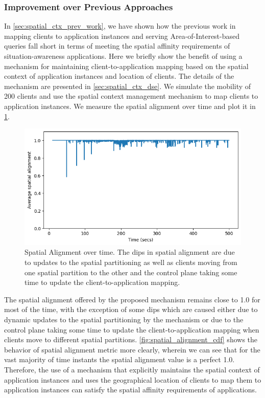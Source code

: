 \subsubsection{Improvement over Previous Approaches}
In \cref{sec:spatial_ctx_prev_work}, we have shown how the previous work in mapping clients to application instances and serving Area-of-Interest-based queries fall short in terms of meeting the spatial affinity requirements of situation-awareness applications. Here we briefly show the benefit of using a mechanism for maintaining client-to-application mapping based on the spatial context of application instances and location of clients. The details of the mechanism are presented in \cref{sec:spatial_ctx_dse}. We simulate the mobility of 200 clients and use the spatial context management mechanism to map clients to application instances. We measure the spatial alignment over time and plot it in \cref{fig:spatial_alignment_summary}.
\begin{figure}
\centering
\includegraphics[width=0.75\linewidth]{figures/mechanisms/spatial_ctx_mgmt/spatial_alignment_vs_time.png}
\caption{Spatial Alignment over time. The dips in spatial alignment are due to updates to the spatial partitioning as well as clients moving from one spatial partition to the other and the control plane taking some time to update the client-to-application mapping.}
\label{fig:spatial_alignment_summary}
\end{figure}
The spatial alignment offered by the proposed mechanism remains close to 1.0 for most of the time, with the exception of some dips which are caused either due to dynamic updates to the spatial partitioning by the mechanism or due to the control plane taking some time to update the client-to-application mapping when clients move to different spatial partitions. \cref{fig:spatial_alignment_cdf} shows the behavior of spatial alignment metric more clearly, wherein we can see that for the vast majority of time instants the spatial alignment value is a perfect 1.0. Therefore, the use of a mechanism that explicitly maintains the spatial context of application instances and uses the geographical location of clients to map them to application instances can satisfy the spatial affinity requirements of applications.
